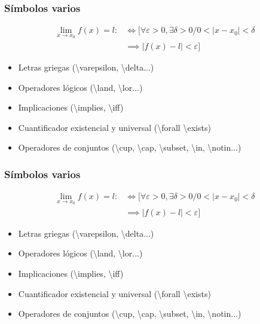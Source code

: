 \begin{frame}[fragile]
    \frametitle{Símbolos varios}
        \begin{align*}
            \lim_{x\to x_{0}}f(x) = l :&\iff \Big[  \forall\varepsilon>0, \exists\delta>0 \Big/ 0<\left|x-x_0\right|<\delta \\
            &\implies \left|f(x)-l\right| <\varepsilon \Big]
        \end{align*}
        \begin{itemize}
            \item{Letras griegas (\textbackslash varepsilon, \textbackslash delta...)}
            \item{Operadores lógicos (\textbackslash land, \textbackslash lor...)}
            \item{Implicaciones (\textbackslash implies, \textbackslash iff)}
            \item{Cuantificador existencial y universal (\textbackslash forall \textbackslash exists)}
            \item{Operadores de conjuntos (\textbackslash cup, \textbackslash cap, \textbackslash subset, \textbackslash in, \textbackslash notin...)}
        \end{itemize}
\end{frame}

\begin{frame}[fragile]
    \frametitle{Símbolos varios}
        \begin{align*}
            \lim_{x\to x_{0}}f(x) = l :&\iff \Big[  \forall\varepsilon>0, \exists\delta>0 \Big/ 0<\left|x-x_0\right|<\delta \\
            &\implies \left|f(x)-l\right| <\varepsilon \Big]
        \end{align*}
        \begin{itemize}
            \item{Letras griegas (\textbackslash varepsilon, \textbackslash delta...)}
            \item{Operadores lógicos (\textbackslash land, \textbackslash lor...)}
            \item{Implicaciones (\textbackslash implies, \textbackslash iff)}
            \item{Cuantificador existencial y universal (\textbackslash forall \textbackslash exists)}
            \item{Operadores de conjuntos (\textbackslash cup, \textbackslash cap, \textbackslash subset, \textbackslash in, \textbackslash notin...)}
        \end{itemize}
\end{frame}
